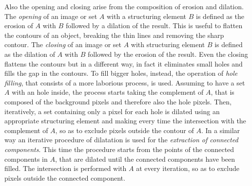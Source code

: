 \documentclass[final,a4paper,12pt,english]{UnicaPhdThesis3}
\begin{document}
Also the opening and closing arise from the composition of erosion and dilation. The \textit{opening} of an image or set $A$ with a structuring element $B$ is defined as the erosion of $A$ with $B$ followed by a dilation of the result. This is useful to flatten the contours of an object, breaking the thin lines and removing the sharp contour. The \textit{closing} of an image or set $A$ with structuring element $B$ is defined as the dilation of $A$ with $B$ followed by the erosion of the result. Even the closing flattens the contours but in a different way, in fact it eliminates small holes and fills the gap in the contours. To fill bigger holes, instead, the operation of \textit{hole filling}, that consists of a more laborious process, is used. Assuming to have a set $A$ with an hole inside, the process starts taking the complement of $A$, that is composed of the background pixels and therefore also the hole pixels. Then, iteratively, a set containing only a pixel for each hole is dilated using an appropriate structuring element and making every time the intersection with the complement of $A$, so as to exclude pixels outside the contour of $A$. In a similar way an iterative procedure of dilatation is used for the \textit{extraction of connected components}. This time the procedure starts from the points of the connected components in $A$, that are dilated until the connected components have been filled. The intersection is performed with $A$ at every iteration, so as to exclude pixels outside the connected component. 
\end{document}
